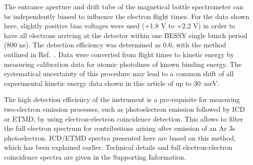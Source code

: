 The entrance aperture and drift tube of the magnetical bottle spectrometer can be independently biased to influence the electron flight times. 
For the data shown here, slightly positive bias voltages were used (+1.8 V to +2.2 V) in order to have all electrons arriving at the detector within one BESSY single bunch period (800 ns). 
The detection efficiency was determined as 0.6, with the method outlined in Ref.\ .
Data were converted from flight times to kinetic energy by measuring calibration data for atomic photolines of known binding energy.
The systematical uncertainty of this procedure may lead to a common shift of all experimental kinetic energy data shown in this article of up to 30~meV.

The high detection efficiency of the instrument is a pre-requisite for measuring two-electron emission processes, such as photoelectron emission followed by ICD or ETMD, by using electron-electron coincidence detection. 
This allows to filter the full electron spectrum for contributions arising after emission of an Ar 3s photoelectron.
ICD/ETMD spectra presented here are based on this method, which has been explained earlier.\cite{mucke_review,Foerstel_phd}
Technical details and full electron-electron coincidence spectra are given in the Supporting Information.
